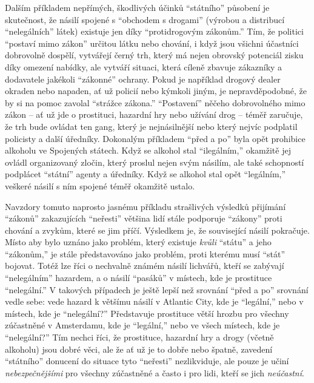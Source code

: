 \documentclass{book}
\begin{document}
Dalším příkladem nepřímých, škodlivých účinků \enquote{státního} působení je skutečnost, že násilí spojené s \enquote{obchodem s drogami} (výrobou a distribucí \enquote{nelegálních} látek) existuje jen díky \enquote{protidrogovým zákonům.} Tím, že politici \enquote{postaví mimo zákon} určitou látku nebo chování, i když jsou všichni účastníci dobrovolně dospělí, vytvářejí černý trh, který má nejen obrovský potenciál zisku díky omezení nabídky, ale vytváří situaci, která cíleně zbavuje zákazníky a dodavatele jakékoli \enquote{zákonné} ochrany. Pokud je například drogový dealer okraden nebo napaden, ať už policií nebo kýmkoli jiným, je nepravděpodobné, že by si na pomoc zavolal \enquote{strážce zákona.} \enquote{Postavení} něčeho dobrovolného mimo zákon -- ať už jde o prostituci, hazardní hry nebo užívání drog -- téměř zaručuje, že trh bude ovládat ten gang, který je nejnásilnější nebo který nejvíc podplatil policisty a další úředníky. Dokonalým příkladem \enquote{před a po} byla opět prohibice alkoholu ve Spojených státech. Když se alkohol stal \enquote{ilegálním,} okamžitě jej ovládl organizovaný zločin, který proslul nejen svým násilím, ale také schopností podplácet \enquote{státní} agenty a úředníky. Když se alkohol stal opět \enquote{legálním,} veškeré násilí s ním spojené téměř okamžitě ustalo.

Navzdory tomuto naprosto jasnému příkladu strašlivých výsledků přijímání \enquote{zákonů} zakazujících \enquote{neřesti} většina lidí stále podporuje \enquote{zákony} proti chování a zvykům, které se jim příčí. Výsledkem je, že související násilí pokračuje. Místo aby bylo uznáno jako problém, který existuje \emph{kvůli} \enquote{státu} a jeho \enquote{zákonům,} je stále představováno jako problém, proti kterému musí \enquote{stát} bojovat. Totéž lze říci o nechvalně známém násilí lichvářů, kteří se zabývají \enquote{nelegálním} hazardem, a o násilí \enquote{pasáků} v místech, kde je prostituce \enquote{nelegální.} V takových případech je ještě lepší než srovnání \enquote{před a po} srovnání vedle sebe: vede hazard k většímu násilí v Atlantic City, kde je \enquote{legální,} nebo v místech, kde je \enquote{nelegální?} Představuje prostituce větší hrozbu pro všechny zúčastněné v Amsterdamu, kde je \enquote{legální,} nebo ve všech místech, kde je \enquote{nelegální?} Tím nechci říci, že prostituce, hazardní hry a drogy (včetně alkoholu) jsou dobré věci, ale že ať už je to dobře nebo špatně, zavedení \enquote{státního} donucení do situace tyto \enquote{neřesti} nezlikviduje, ale pouze je učiní \emph{nebezpečnějšími} pro všechny zúčastněné a často i pro lidi, kteří se jich \emph{neúčastní}.
\end{document}
